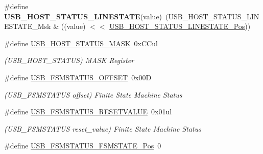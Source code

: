 \begin{DoxyCompactItemize}
\item 
\hypertarget{group___s_a_m_l21___u_s_b_ga5c0bed61aa6d9df65ddbd4da09778c2f}{}\#define {\bfseries U\+S\+B\+\_\+\+H\+O\+S\+T\+\_\+\+S\+T\+A\+T\+U\+S\+\_\+\+L\+I\+N\+E\+S\+T\+A\+T\+E}(value)~(U\+S\+B\+\_\+\+H\+O\+S\+T\+\_\+\+S\+T\+A\+T\+U\+S\+\_\+\+L\+I\+N\+E\+S\+T\+A\+T\+E\+\_\+\+Msk \& ((value) $<$$<$ \hyperlink{group___s_a_m_l21___u_s_b_ga7920c7422a76bdd54c13a72422a6f45b}{U\+S\+B\+\_\+\+H\+O\+S\+T\+\_\+\+S\+T\+A\+T\+U\+S\+\_\+\+L\+I\+N\+E\+S\+T\+A\+T\+E\+\_\+\+Pos}))\label{group___s_a_m_l21___u_s_b_ga5c0bed61aa6d9df65ddbd4da09778c2f}

\item 
\hypertarget{group___s_a_m_l21___u_s_b_ga6814d5a6c684c2231bf7403a84a94fe6}{}\#define \hyperlink{group___s_a_m_l21___u_s_b_ga6814d5a6c684c2231bf7403a84a94fe6}{U\+S\+B\+\_\+\+H\+O\+S\+T\+\_\+\+S\+T\+A\+T\+U\+S\+\_\+\+M\+A\+S\+K}~0x\+C\+Cul\label{group___s_a_m_l21___u_s_b_ga6814d5a6c684c2231bf7403a84a94fe6}

\begin{DoxyCompactList}\small\item\em (U\+S\+B\+\_\+\+H\+O\+S\+T\+\_\+\+S\+T\+A\+T\+U\+S) M\+A\+S\+K Register \end{DoxyCompactList}\item 
\hypertarget{group___s_a_m_l21___u_s_b_gaa059828dcce189ce1bef027cbeed4a92}{}\#define \hyperlink{group___s_a_m_l21___u_s_b_gaa059828dcce189ce1bef027cbeed4a92}{U\+S\+B\+\_\+\+F\+S\+M\+S\+T\+A\+T\+U\+S\+\_\+\+O\+F\+F\+S\+E\+T}~0x00\+D\label{group___s_a_m_l21___u_s_b_gaa059828dcce189ce1bef027cbeed4a92}

\begin{DoxyCompactList}\small\item\em (U\+S\+B\+\_\+\+F\+S\+M\+S\+T\+A\+T\+U\+S offset) Finite State Machine Status \end{DoxyCompactList}\item 
\hypertarget{group___s_a_m_l21___u_s_b_ga0e05572b969d24133f1e5651fff2015e}{}\#define \hyperlink{group___s_a_m_l21___u_s_b_ga0e05572b969d24133f1e5651fff2015e}{U\+S\+B\+\_\+\+F\+S\+M\+S\+T\+A\+T\+U\+S\+\_\+\+R\+E\+S\+E\+T\+V\+A\+L\+U\+E}~0x01ul\label{group___s_a_m_l21___u_s_b_ga0e05572b969d24133f1e5651fff2015e}

\begin{DoxyCompactList}\small\item\em (U\+S\+B\+\_\+\+F\+S\+M\+S\+T\+A\+T\+U\+S reset\+\_\+value) Finite State Machine Status \end{DoxyCompactList}\item 
\hypertarget{group___s_a_m_l21___u_s_b_ga1584eb0083050e0e37701f538d71c143}{}\#define \hyperlink{group___s_a_m_l21___u_s_b_ga1584eb0083050e0e37701f538d71c143}{U\+S\+B\+\_\+\+F\+S\+M\+S\+T\+A\+T\+U\+S\+\_\+\+F\+S\+M\+S\+T\+A\+T\+E\+\_\+\+Pos}~0\label{group___s_a_m_l21___u_s_b_ga1584eb0083050e0e37701f538d71c143}


\end{DoxyCompactItemize}
